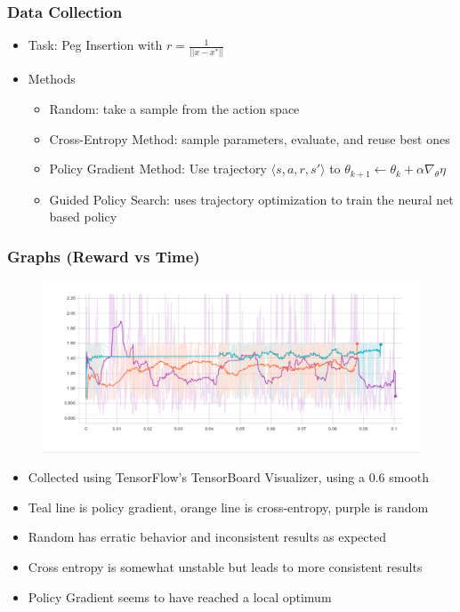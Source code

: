 \documentclass[12pt,handout]{beamer}
\begin{document}
\begin{frame}
    \frametitle{Data Collection}
    \begin{itemize}
        \item{Task: Peg Insertion with $r=\frac{1}{||x-x^*||}$}%
        \item{Methods}
        \begin{itemize}
        \item{Random: take a sample from the action space}
        \item{Cross-Entropy Method: sample parameters, evaluate, and reuse best ones}
        \item{Policy Gradient Method: Use trajectory $\langle s, a, r, s' \rangle$ to $\theta_{k+1} \leftarrow \theta_{k} + \alpha\nabla_\theta \eta$}
        \item{Guided Policy Search: uses trajectory optimization to train the neural net based policy}
    \end{itemize}
\end{itemize}
\end{frame}
\begin{frame}
    \frametitle{Graphs (Reward vs Time)}
    \begin{figure}
        \includegraphics[scale=0.2]{smoothed}
    \end{figure}
    \begin{itemize}
        \item{Collected using TensorFlow's TensorBoard Visualizer, using a $0.6$ smooth}
        \item{Teal line is policy gradient, orange line is cross-entropy, purple is random}
        \item{Random has erratic behavior and inconsistent results as expected}
        \item{Cross entropy is somewhat unstable but leads to more consistent results}
        \item{Policy Gradient seems to have reached a local optimum}
    \end{itemize}
\end{frame}
\end{document}
